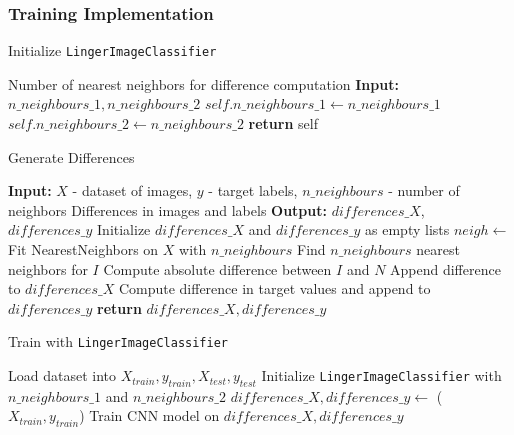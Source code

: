 \documentclass[a4paper, 12pt]{report}
\begin{document}
\subsubsection{Training Implementation}
\begin{algorithm}
    \caption{Initialize \texttt{LingerImageClassifier}}
    \label{alg:initialize_classifier}
    \begin{algorithmic}[1]
    \State Number of nearest neighbors for difference computation
    \State \textbf{Input:} $n\_neighbours\_1, n\_neighbours\_2$ 
        \State $self.n\_neighbours\_1 \gets n\_neighbours\_1$
        \State $self.n\_neighbours\_2 \gets n\_neighbours\_2$
        \State \textbf{return} self
    \EndProcedure
    \end{algorithmic}
\end{algorithm}
\clearpage

\begin{algorithm}
    \caption{Generate Differences}
    \label{alg:generate_image_differences_implementation}
    \begin{algorithmic}[1]
        \State \textbf{Input:} $X$ - dataset of images, $y$ - target labels, $n\_neighbours$ - number of neighbors
        \State Differences in images and labels
        \State \textbf{Output:} $differences\_X$, $differences\_y$ 
        \State Initialize $differences\_X$ and $differences\_y$ as empty lists
        \State $neigh \gets$ Fit NearestNeighbors on $X$ with $n\_neighbours$
            \State Find $n\_neighbours$ nearest neighbors for $I$
                \State Compute absolute difference between $I$ and $N$
                \State Append difference to $differences\_X$
                \State Compute difference in target values and append to $differences\_y$
            \EndFor
        \EndFor
        \State \textbf{return} $differences\_X, differences\_y$
    \EndProcedure
    \end{algorithmic}
\end{algorithm}
\clearpage

\begin{algorithm}
    \caption{Train with \texttt{LingerImageClassifier}}
    \label{alg:train_image_class_train_implementation}
    \begin{algorithmic}[1]
        \State Load dataset into $X_{train}, y_{train}, X_{test}, y_{test}$
        \State Initialize \texttt{LingerImageClassifier} with $n\_neighbours\_1$ and $n\_neighbours\_2$
        \State $differences\_X, differences\_y \gets$ ($X_{train}, y_{train}$)
        \State Train CNN model on $differences\_X, differences\_y$
        \EndProcedure
    \end{algorithmic}
\end{algorithm}
\clearpage
\end{document}
